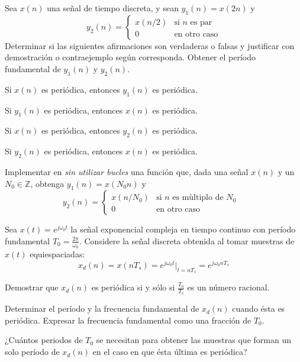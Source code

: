 \begin{ejercicio}
Sea $x(n)$ una señal de tiempo discreta, y sean $y_1(n) = x(2 n)$ y 
\begin{equation*}
y_2(n) = \begin{cases}
x(n/2) & \mbox{si $n$ es par} \\
0 & \mbox{en otro caso}
\end{cases}
\end{equation*}
Determinar si las siguientes afirmaciones son verdaderas o falsas y justificar con demostración o contraejemplo según corresponda. Obtener el período fundamental de $y_1(n)$ y $y_2(n)$.

\inciso Si $x(n)$ es periódica, entonces $y_1(n)$ es periódica.

\inciso Si $y_1(n)$ es periódica, entonces $x(n)$ es periódica.

\inciso Si $x(n)$ es periódica, entonces $y_2(n)$ es periódica.

\inciso Si $y_2(n)$ es periódica, entonces $x(n)$ es periódica.

\end{ejercicio}

\begin{ejercicio}
Implementar en \Keyboardsym \emph{sin utilizar bucles} una función que, dada una señal $x(n)$ y un $N_0\in \mathbb{Z}$, obtenga $y_1(n)=x(N_0n)$ y 
\begin{equation*}
y_2(n) = \begin{cases}
x(n/N_0) & \mbox{si $n$ es m\`{u}ltiplo de $N_0$ } \\
0 & \mbox{en otro caso}
\end{cases}
\end{equation*}
\end{ejercicio}

\begin{ejercicio}
Sea $x(t)=e^{j\omega_0t}$ la señal exponencial compleja en tiempo continuo con período fundamental $T_0=\frac{2\pi}{\omega_0}$. Considere la señal discreta obtenida al tomar muestras de $x(t)$ equiespaciadas:
\begin{equation*}
    x_d(n) = x(nT_s) = e^{j\omega_0t}\big|_{t=nT_s} = e^{j\omega_0nT_s}
\end{equation*}

\inciso Demostrar que $x_d(n)$ es periódica si y sólo si $\frac{T_0}{T_s}$ es un número racional.

\inciso Determinar el período y la frecuencia fundamental de $x_d(n)$ cuando ésta es periódica. Expresar la frecuencia fundamental como una fracción de $T_0$.

\inciso ¿Cuántos periodos de $T_0$ se necesitan para obtener las muestras que forman un solo período de $x_d(n)$ en el caso en que ésta última es periódica?
\end{ejercicio}


